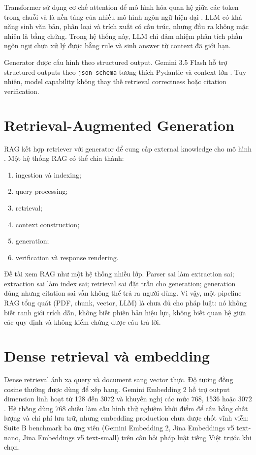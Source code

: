 \documentclass[a4paper,12pt]{extreport}
\newcommand{\code}[1]{\texttt{#1}}
\begin{document}
Transformer sử dụng cơ chế attention để mô hình hóa quan hệ giữa các token trong chuỗi và là nền tảng của nhiều mô hình ngôn ngữ hiện đại \cite{vaswani2017attention}. LLM có khả năng sinh văn bản, phân loại và trích xuất có cấu trúc, nhưng đầu ra không mặc nhiên là bằng chứng. Trong hệ thống này, LLM chỉ đảm nhiệm phân tích phần ngôn ngữ chưa xử lý được bằng rule và sinh answer từ context đã giới hạn.

Generator được cấu hình theo structured output. Gemini 3.5 Flash hỗ trợ structured outputs theo \code{json\_schema} tương thích Pydantic và context lớn \cite{google2026gemini35flash}. Tuy nhiên, model capability không thay thế retrieval correctness hoặc citation verification.

\section{Retrieval-Augmented Generation}

RAG kết hợp retriever với generator để cung cấp external knowledge cho mô hình \cite{lewis2020rag}. Một hệ thống RAG có thể chia thành:

\begin{enumerate}
  \item ingestion và indexing;
  \item query processing;
  \item retrieval;
  \item context construction;
  \item generation;
  \item verification và response rendering.
\end{enumerate}

Đề tài xem RAG như một hệ thống nhiều lớp. Parser sai làm extraction sai; extraction sai làm index sai; retrieval sai đặt trần cho generation; generation đúng nhưng citation sai vẫn không thể trả ra người dùng. Vì vậy, một pipeline RAG tổng quát (PDF, chunk, vector, LLM) là chưa đủ cho pháp luật: nó không biết ranh giới trích dẫn, không biết phiên bản hiệu lực, không biết quan hệ giữa các quy định và không kiểm chứng được câu trả lời.

\section{Dense retrieval và embedding}

Dense retrieval ánh xạ query và document sang vector thực. Độ tương đồng cosine thường được dùng để xếp hạng. Gemini Embedding 2 hỗ trợ output dimension linh hoạt từ 128 đến 3072 và khuyến nghị các mức 768, 1536 hoặc 3072 \cite{google2026embedding2}. Hệ thống dùng 768 chiều làm cấu hình thử nghiệm khởi điểm để cân bằng chất lượng và chi phí lưu trữ, nhưng embedding production chưa được chốt vĩnh viễn: Suite B benchmark ba ứng viên (Gemini Embedding 2, Jina Embeddings v5 text-nano, Jina Embeddings v5 text-small) trên câu hỏi pháp luật tiếng Việt trước khi chọn.
\end{document}
